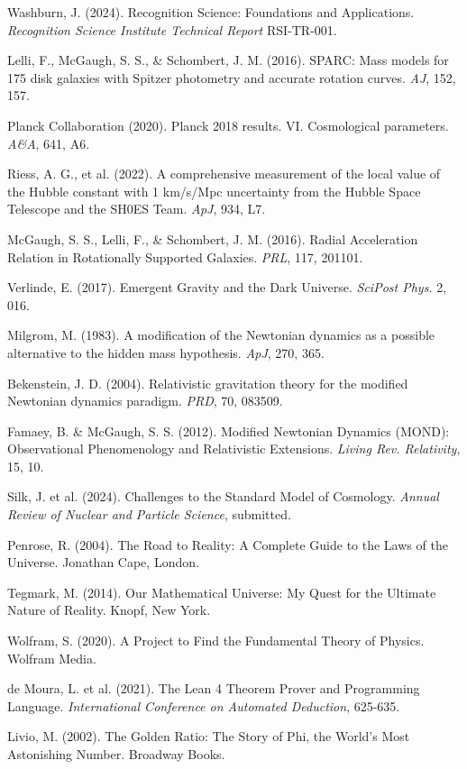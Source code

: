 \documentclass[12pt,a4paper]{article}
\begin{document}
\begin{thebibliography}{99}
 Washburn, J. (2024). Recognition Science: Foundations and Applications. \textit{Recognition Science Institute Technical Report} RSI-TR-001.

 Lelli, F., McGaugh, S. S., \& Schombert, J. M. (2016). SPARC: Mass models for 175 disk galaxies with Spitzer photometry and accurate rotation curves. \textit{AJ}, 152, 157.

 Planck Collaboration (2020). Planck 2018 results. VI. Cosmological parameters. \textit{A\&A}, 641, A6.

 Riess, A. G., et al. (2022). A comprehensive measurement of the local value of the Hubble constant with 1 km/s/Mpc uncertainty from the Hubble Space Telescope and the SH0ES Team. \textit{ApJ}, 934, L7.

 McGaugh, S. S., Lelli, F., \& Schombert, J. M. (2016). Radial Acceleration Relation in Rotationally Supported Galaxies. \textit{PRL}, 117, 201101.

 Verlinde, E. (2017). Emergent Gravity and the Dark Universe. \textit{SciPost Phys.} 2, 016.

 Milgrom, M. (1983). A modification of the Newtonian dynamics as a possible alternative to the hidden mass hypothesis. \textit{ApJ}, 270, 365.

 Bekenstein, J. D. (2004). Relativistic gravitation theory for the modified Newtonian dynamics paradigm. \textit{PRD}, 70, 083509.

 Famaey, B. \& McGaugh, S. S. (2012). Modified Newtonian Dynamics (MOND): Observational Phenomenology and Relativistic Extensions. \textit{Living Rev. Relativity}, 15, 10.

 Silk, J. et al. (2024). Challenges to the Standard Model of Cosmology. \textit{Annual Review of Nuclear and Particle Science}, submitted.

 Penrose, R. (2004). The Road to Reality: A Complete Guide to the Laws of the Universe. Jonathan Cape, London.

 Tegmark, M. (2014). Our Mathematical Universe: My Quest for the Ultimate Nature of Reality. Knopf, New York.

 Wolfram, S. (2020). A Project to Find the Fundamental Theory of Physics. Wolfram Media.

 de Moura, L. et al. (2021). The Lean 4 Theorem Prover and Programming Language. \textit{International Conference on Automated Deduction}, 625-635.

 Livio, M. (2002). The Golden Ratio: The Story of Phi, the World's Most Astonishing Number. Broadway Books.

\end{thebibliography}
\end{document}
